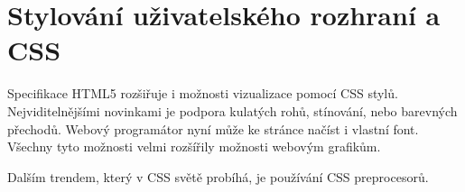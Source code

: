\section{Stylování uživatelského rozhraní a CSS}

Specifikace HTML5 rozšiřuje i možnosti vizualizace pomocí CSS stylů. Nejviditelnějšími novinkami je podpora kulatých rohů, stínování, nebo barevných přechodů. Webový programátor nyní může ke stránce načíst i vlastní font. Všechny tyto možnosti velmi rozšířily možnosti webovým grafikům.

Dalším trendem, který v CSS světě probíhá, je používání CSS preprocesorů. 








